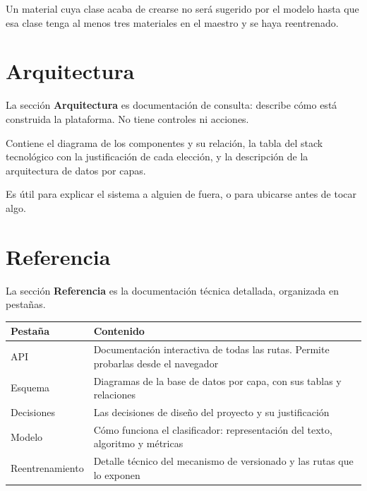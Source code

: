 \begin{aviso}
Un material cuya clase acaba de crearse no será sugerido por el modelo hasta que
esa clase tenga al menos tres materiales en el maestro y se haya reentrenado.
\end{aviso}

\newpage
\section{Arquitectura}

La sección \textbf{Arquitectura} es documentación de consulta: describe cómo
está construida la plataforma. No tiene controles ni acciones.


Contiene el diagrama de los componentes y su relación, la tabla del stack
tecnológico con la justificación de cada elección, y la descripción de la
arquitectura de datos por capas.

Es útil para explicar el sistema a alguien de fuera, o para ubicarse antes de
tocar algo.

\newpage
\section{Referencia}

La sección \textbf{Referencia} es la documentación técnica detallada,
organizada en pestañas.


\begin{center}
\begin{tabular}{@{}lp{9.2cm}@{}}
\toprule
\textbf{Pestaña} & \textbf{Contenido} \\
\midrule
API             & Documentación interactiva de todas las rutas. Permite probarlas desde el navegador \\
Esquema         & Diagramas de la base de datos por capa, con sus tablas y relaciones \\
Decisiones      & Las decisiones de diseño del proyecto y su justificación \\
Modelo          & Cómo funciona el clasificador: representación del texto, algoritmo y métricas \\
Reentrenamiento & Detalle técnico del mecanismo de versionado y las rutas que lo exponen \\
\bottomrule
\end{tabular}
\end{center}

